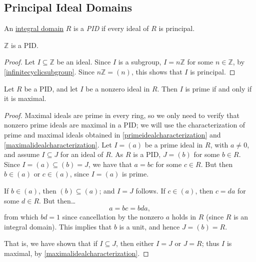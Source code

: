 \subsection{Principal Ideal Domains}\label{principalidealdomains}
An \hyperref[integraldomain]{integral domain} $R$ is a \emph{PID} if every ideal of $R$ is principal.

\begin{proposition}
$\mathbb{Z}$ is a PID.
\end{proposition}

\begin{proof}
Let $I \subseteq \mathbb{Z}$ be an ideal. Since $I$ is a subgroup, $I = n\mathbb{Z}$ for some $n \in \mathbb{Z}$, by
\ref{infinitecyclicsubgroup}. Since $n\mathbb{Z} = (n)$, this shows that $I$ is principal.
\end{proof}

\begin{proposition}
Let $R$ be a PID, and let $I$ be a nonzero ideal in $R$. Then $I$ is prime if and only if it is maximal.
\end{proposition}

\begin{proof}
Maximal ideals are prime in every ring, so we only need to verify that nonzero prime ideals are maximal in a PID;
we will use the characterization of prime and maximal ideals obtained in \ref{primeidealcharacterization} and
\ref{maximalidealcharacterization}. Let $I = (a)$ be a prime ideal in $R$, with $a \neq 0$, and assume $I \subseteq J$
for an ideal of $R$. As $R$ is a PID, $J = (b)$ for some $b \in R$. Since $I = (a) \subseteq (b) = J$, we have that $a=bc$
for some $c \in R$. But then $b \in (a)$ or $c \in (a)$, since $I = (a)$ is prime.

If $b \in (a)$, then $(b) \subseteq (a)$; and $I = J$ follows. If $c \in (a)$, then $c = da$ for some $d \in R$. But then\dots
$$a=bc=bda,$$
from which $bd = 1$ since cancellation by the nonzero $a$ holds in $R$ (since $R$ is an integral domain). This implies that $b$
is a unit, and hence $J = (b) = R$.

That is, we have shown that if $I \subseteq J$, then either $I = J$ or $J = R$; thus $I$ is maximal, by \ref{maximalidealcharacterization}.
\end{proof}